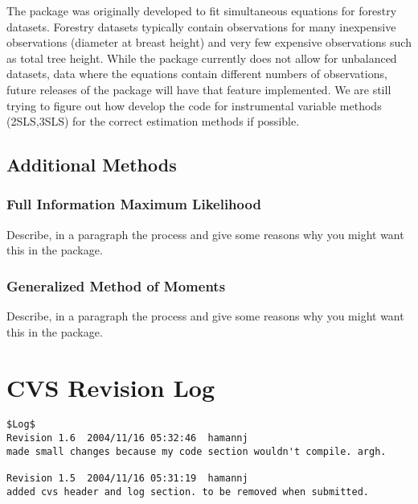 \documentclass[article]{jss}
\begin{document}
The  package was originally developed to fit
simultaneous equations for forestry datasets. Forestry datasets
typically contain observations for many inexpensive observations
(diameter at breast height) and very few expensive observations such
as total tree height. While the package currently does not allow for
unbalanced datasets, data where the equations contain different
numbers of observations, future releases of the package will have that
feature implemented. We are still trying to figure out how develop the
code for instrumental variable methods (2SLS,3SLS) for the correct
estimation methods if possible.

\subsection{Additional Methods}\label{sec:summary_additional_methods}


\subsubsection{Full Information Maximum Likelihood}

Describe, in a paragraph the process and give some reasons why you
might want this in the package. 


\subsubsection{Generalized Method of Moments}

Describe, in a paragraph the process and give some reasons why you
might want this in the package. 


\section{CVS Revision Log}
\begin{verbatim}
$Log$
Revision 1.6  2004/11/16 05:32:46  hamannj
made small changes because my code section wouldn't compile. argh.

Revision 1.5  2004/11/16 05:31:19  hamannj
added cvs header and log section. to be removed when submitted.

\end{verbatim}




%
\end{document}
